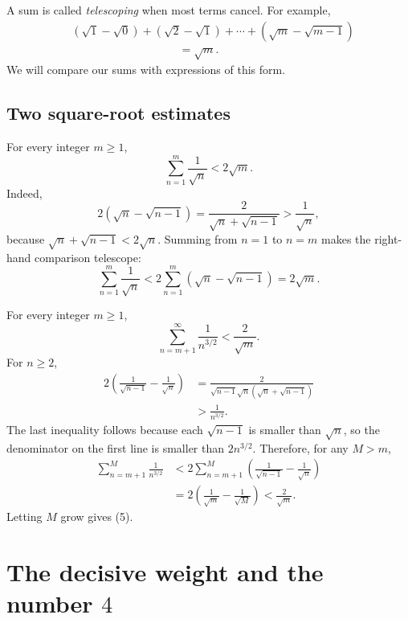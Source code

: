 \documentclass[11pt]{article}
\begin{document}
A sum is called \emph{telescoping} when most terms cancel. For example,
\[
\begin{aligned}
 &(\sqrt1-\sqrt0)+(\sqrt2-\sqrt1)+\cdots+(\sqrt m-\sqrt{m-1})\\
 &\hspace{4cm}=\sqrt m.
\end{aligned}
\]
We will compare our sums with expressions of this form.

\subsection{Two square-root estimates}

\begin{solutionBox}
For every integer \(m\geq1\),
\[
  \boxed{\displaystyle
  \sum_{n=1}^{m}\frac1{\sqrt n}<2\sqrt m.}
  \tag{4}
\]
Indeed,
\[
  2(\sqrt n-\sqrt{n-1})
  =\frac{2}{\sqrt n+\sqrt{n-1}}
  >\frac1{\sqrt n},
\]
because \(\sqrt n+\sqrt{n-1}<2\sqrt n\). Summing from \(n=1\) to \(n=m\) makes the right-hand comparison telescope:
\[
  \sum_{n=1}^{m}\frac1{\sqrt n}
  <2\sum_{n=1}^{m}(\sqrt n-\sqrt{n-1})
  =2\sqrt m.
\]
\end{solutionBox}

\begin{solutionBox}
For every integer \(m\geq1\),
\[
  \boxed{\displaystyle
  \sum_{n=m+1}^{\infty}\frac1{n^{3/2}}<\frac2{\sqrt m}.}
  \tag{5}
\]
For \(n\geq2\),
\[
\begin{aligned}
  2\left(\frac1{\sqrt{n-1}}-\frac1{\sqrt n}\right)
  &=\frac{2}{\sqrt{n-1}\sqrt n(\sqrt n+\sqrt{n-1})}\\
  &>\frac1{n^{3/2}}.
\end{aligned}
\]
The last inequality follows because each \(\sqrt{n-1}\) is smaller than \(\sqrt n\), so the denominator on the first line is smaller than \(2n^{3/2}\). Therefore, for any \(M>m\),
\[
\begin{aligned}
 \sum_{n=m+1}^{M}\frac1{n^{3/2}}
 &<2\sum_{n=m+1}^{M}
 \left(\frac1{\sqrt{n-1}}-\frac1{\sqrt n}\right)\\
 &=2\left(\frac1{\sqrt m}-\frac1{\sqrt M}\right)
 <\frac2{\sqrt m}.
\end{aligned}
\]
Letting \(M\) grow gives (5).
\end{solutionBox}

\section{The decisive weight and the number \(4\)}
\end{document}
